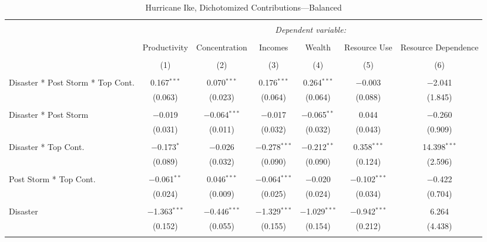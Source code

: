 
\begin{table}[!htbp] \centering 
  \caption{Hurricane Ike, Dichotomized Contributions---Balanced} 
  \label{} 
\footnotesize 
\begin{tabular}{@{\extracolsep{5pt}}lcccccc} 
\\[-1.8ex]\hline 
\hline \\[-1.8ex] 
 & \multicolumn{6}{c}{\textit{Dependent variable:}} \\ 
\cline{2-7} 
\\[-1.8ex] & Productivity & Concentration & Incomes & Wealth & Resource Use & Resource Dependence \\ 
\\[-1.8ex] & (1) & (2) & (3) & (4) & (5) & (6)\\ 
\hline \\[-1.8ex] 
 Disaster * Post Storm * Top Cont. & 0.167$^{***}$ & 0.070$^{***}$ & 0.176$^{***}$ & 0.264$^{***}$ & $-$0.003 & $-$2.041 \\ 
  & (0.063) & (0.023) & (0.064) & (0.064) & (0.088) & (1.845) \\ 
  & & & & & & \\ 
 Disaster * Post Storm & $-$0.019 & $-$0.064$^{***}$ & $-$0.017 & $-$0.065$^{**}$ & 0.044 & $-$0.260 \\ 
  & (0.031) & (0.011) & (0.032) & (0.032) & (0.043) & (0.909) \\ 
  & & & & & & \\ 
 Disaster * Top Cont. & $-$0.173$^{*}$ & $-$0.026 & $-$0.278$^{***}$ & $-$0.212$^{**}$ & 0.358$^{***}$ & 14.398$^{***}$ \\ 
  & (0.089) & (0.032) & (0.090) & (0.090) & (0.124) & (2.596) \\ 
  & & & & & & \\ 
 Post Storm *  Top Cont. & $-$0.061$^{**}$ & 0.046$^{***}$ & $-$0.064$^{***}$ & $-$0.020 & $-$0.102$^{***}$ & $-$0.422 \\ 
  & (0.024) & (0.009) & (0.025) & (0.024) & (0.034) & (0.704) \\ 
  & & & & & & \\ 
 Disaster & $-$1.363$^{***}$ & $-$0.446$^{***}$ & $-$1.329$^{***}$ & $-$1.029$^{***}$ & $-$0.942$^{***}$ & 6.264 \\ 
  & (0.152) & (0.055) & (0.155) & (0.154) & (0.212) & (4.438) \\ 
  & & & & & & \\ 

\end{tabular}
\end{table}
